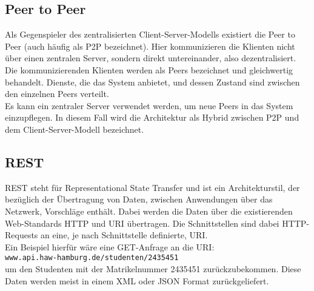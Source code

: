 \subsection{Peer to Peer} %
\label{sub:Peer_to_Peer}
Als Gegenspieler des zentralisierten Client-Server-Modells existiert die Peer to Peer (auch häufig als P2P bezeichnet).
Hier kommunizieren die Klienten nicht über einen zentralen Server, sondern direkt untereinander, also dezentralisiert.
Die kommunizierenden Klienten werden als Peers bezeichnet und gleichwertig behandelt.
Dienste, die das System anbietet, und dessen Zustand sind zwischen den einzelnen Peers verteilt.~\cite{softArchGrundl}\\

Es kann ein zentraler Server verwendet werden, um neue Peers in das System einzupflegen.
In diesem Fall wird die Architektur als Hybrid zwischen P2P und dem Client-Server-Modell bezeichnet.~\cite{softArchGrundl}

\subsection{REST} %
\label{sub:REST}
REST steht für \glq{}Representational State Transfer\grq{} und ist ein Architekturstil, der bezüglich der Übertragung von Daten, zwischen Anwendungen über das Netzwerk, Vorschläge enthält.
Dabei werden die Daten über die existierenden Web-Standards HTTP und URI übertragen. %
Die Schnittstellen sind dabei HTTP-Requests an eine, je nach Schnittstelle definierte, URI.~\cite{softArchGrundl}\\
Ein Beispiel hierfür wäre eine GET-Anfrage an die URI:\\
\lstinline{www.api.haw-hamburg.de/studenten/2435451}\\
um den Studenten mit der Matrikelnummer 2435451 zurückzubekommen.
Diese Daten werden meist in einem XML oder JSON Format zurückgeliefert. %

